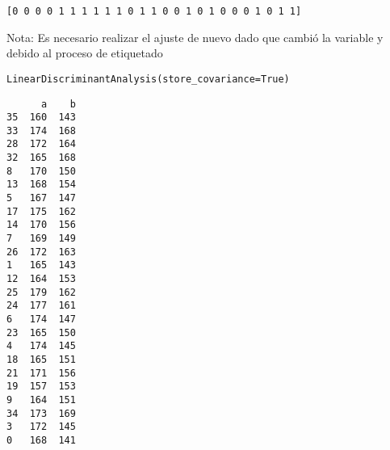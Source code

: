 \begin{Shaded}
\begin{Highlighting}[]
\OperatorTok{=}
\end{Highlighting}
\end{Shaded}


\begin{Shaded}
\begin{Highlighting}[]
\OperatorTok{=}
\end{Highlighting}
\end{Shaded}


\begin{Shaded}
\begin{Highlighting}[]
\end{Highlighting}
\end{Shaded}

\begin{verbatim}
[0 0 0 0 1 1 1 1 1 1 0 1 1 0 0 1 0 1 0 0 0 1 0 1 1]
\end{verbatim}


Nota: Es necesario realizar el ajuste de nuevo dado que cambió la
variable y debido al proceso de etiquetado


\begin{Shaded}
\begin{Highlighting}[]
\end{Highlighting}
\end{Shaded}

\begin{verbatim}
LinearDiscriminantAnalysis(store_covariance=True)
\end{verbatim}


\begin{Shaded}
\begin{Highlighting}[]
\OperatorTok{=}
\end{Highlighting}
\end{Shaded}


\begin{Shaded}
\begin{Highlighting}[]
\end{Highlighting}
\end{Shaded}

\begin{verbatim}
      a    b
35  160  143
33  174  168
28  172  164
32  165  168
8   170  150
13  168  154
5   167  147
17  175  162
14  170  156
7   169  149
26  172  163
1   165  143
12  164  153
25  179  162
24  177  161
6   174  147
23  165  150
4   174  145
18  165  151
21  171  156
19  157  153
9   164  151
34  173  169
3   172  145
0   168  141
\end{verbatim}


